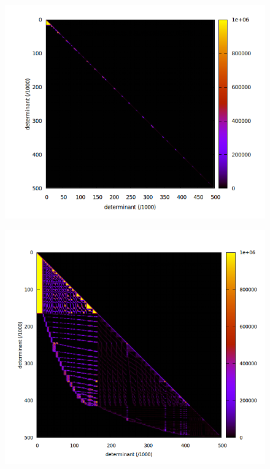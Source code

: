 \documentclass[./thesis.tex]{subfiles}
\begin{document}
    
   
\begin{figure}[H]
	\begin{center}
		\includegraphics[width=0.6\columnwidth]{figures/davidson/aabb_subspace}
		\caption{{\label{fig:aabb_subspace}
		}}
	\end{center}
\end{figure}

\begin{figure}[H]
	\begin{center}
		\includegraphics[width=0.55\columnwidth]{figures/davidson/ab_subspace}
		\caption{{\label{fig:ab_subspace}
		}}
	\end{center}
\end{figure}
\end{document}
